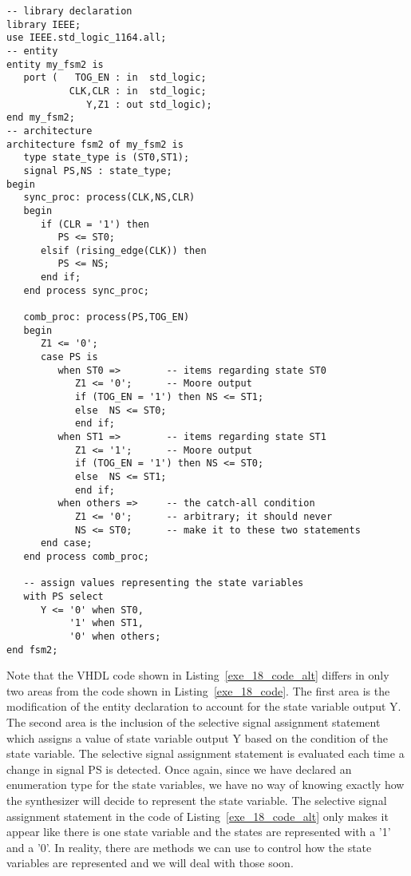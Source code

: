 \noindent
\begin{minipage}{0.99\linewidth}
\begin{lstlisting}[label=exe_18_code_alt, caption=Solution to Example~18 that include state variable as output.]
-- library declaration
library IEEE;
use IEEE.std_logic_1164.all;
-- entity
entity my_fsm2 is
   port (   TOG_EN : in  std_logic;
           CLK,CLR : in  std_logic;
              Y,Z1 : out std_logic);
end my_fsm2;
-- architecture
architecture fsm2 of my_fsm2 is
   type state_type is (ST0,ST1);
   signal PS,NS : state_type;
begin
   sync_proc: process(CLK,NS,CLR)
   begin
      if (CLR = '1') then
         PS <= ST0;
      elsif (rising_edge(CLK)) then
         PS <= NS;
      end if;
   end process sync_proc;

   comb_proc: process(PS,TOG_EN)
   begin
      Z1 <= '0';
      case PS is
         when ST0 =>        -- items regarding state ST0
            Z1 <= '0';      -- Moore output
            if (TOG_EN = '1') then NS <= ST1;
            else  NS <= ST0;
            end if;
         when ST1 =>        -- items regarding state ST1
            Z1 <= '1';      -- Moore output
            if (TOG_EN = '1') then NS <= ST0;
            else  NS <= ST1;
            end if;
         when others =>     -- the catch-all condition
            Z1 <= '0';      -- arbitrary; it should never
            NS <= ST0;      -- make it to these two statements
      end case;
   end process comb_proc;

   -- assign values representing the state variables
   with PS select
      Y <= '0' when ST0,
           '1' when ST1,
           '0' when others;
end fsm2;
\end{lstlisting}
\end{minipage}

Note that the VHDL code shown in Listing~\ref{exe_18_code_alt} differs in only two areas from the code shown in Listing~\ref{exe_18_code}. The first area is the modification of the entity declaration to account for the state variable output Y. The second area is the inclusion of the selective signal assignment statement which assigns a value of state variable output Y based on the condition of the state variable. The selective signal assignment statement is evaluated each time a change in signal PS is detected. Once again, since we have declared an enumeration type for the state variables, we have no way of knowing exactly how the synthesizer will decide to represent the state variable. The selective signal assignment statement in the code of Listing~\ref{exe_18_code_alt} only makes it appear like there is one state variable and the states are represented with a '1' and a '0'. In reality, there are methods we can use to control how the state variables are represented and we will deal with those soon.

